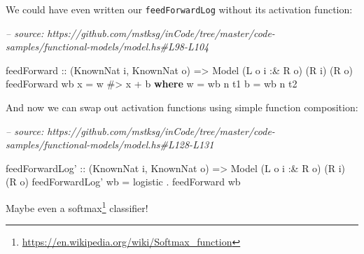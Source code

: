 \documentclass[]{article}
\newenvironment{Shaded}{}{}
\newcommand{\CommentTok}[1]{\textcolor[rgb]{0.38,0.63,0.69}{\textit{#1}}}
\newcommand{\DataTypeTok}[1]{\textcolor[rgb]{0.56,0.13,0.00}{#1}}
\newcommand{\FunctionTok}[1]{\textcolor[rgb]{0.02,0.16,0.49}{#1}}
\newcommand{\KeywordTok}[1]{\textcolor[rgb]{0.00,0.44,0.13}{\textbf{#1}}}
\newcommand{\NormalTok}[1]{#1}
\newcommand{\OtherTok}[1]{\textcolor[rgb]{0.00,0.44,0.13}{#1}}
\renewcommand{\href}[2]{#2\footnote{\url{#1}}}
\begin{document}
We could have even written our \texttt{feedForwardLog} without its activation
function:

\begin{Shaded}
\begin{Highlighting}[]
\CommentTok{-- source: https://github.com/mstksg/inCode/tree/master/code-samples/functional-models/model.hs#L98-L104}

\NormalTok{feedForward}
\OtherTok{    ::}\NormalTok{ (}\DataTypeTok{KnownNat}\NormalTok{ i, }\DataTypeTok{KnownNat}\NormalTok{ o)}
    \OtherTok{=>} \DataTypeTok{Model}\NormalTok{ (}\DataTypeTok{L}\NormalTok{ o i }\FunctionTok{:&} \DataTypeTok{R}\NormalTok{ o) (}\DataTypeTok{R}\NormalTok{ i) (}\DataTypeTok{R}\NormalTok{ o)}
\NormalTok{feedForward wb x }\FunctionTok{=}\NormalTok{ w }\FunctionTok{#>}\NormalTok{ x }\FunctionTok{+}\NormalTok{ b}
  \KeywordTok{where}
\NormalTok{    w }\FunctionTok{=}\NormalTok{ wb }\FunctionTok{^^.}\NormalTok{ t1}
\NormalTok{    b }\FunctionTok{=}\NormalTok{ wb }\FunctionTok{^^.}\NormalTok{ t2}
\end{Highlighting}
\end{Shaded}

And now we can swap out activation functions using simple function composition:

\begin{Shaded}
\begin{Highlighting}[]
\CommentTok{-- source: https://github.com/mstksg/inCode/tree/master/code-samples/functional-models/model.hs#L128-L131}

\NormalTok{feedForwardLog'}
\OtherTok{    ::}\NormalTok{ (}\DataTypeTok{KnownNat}\NormalTok{ i, }\DataTypeTok{KnownNat}\NormalTok{ o)}
    \OtherTok{=>} \DataTypeTok{Model}\NormalTok{ (}\DataTypeTok{L}\NormalTok{ o i }\FunctionTok{:&} \DataTypeTok{R}\NormalTok{ o) (}\DataTypeTok{R}\NormalTok{ i) (}\DataTypeTok{R}\NormalTok{ o)}
\NormalTok{feedForwardLog' wb }\FunctionTok{=}\NormalTok{ logistic }\FunctionTok{.}\NormalTok{ feedForward wb}
\end{Highlighting}
\end{Shaded}

Maybe even a \href{https://en.wikipedia.org/wiki/Softmax_function}{softmax}
classifier!
\end{document}
